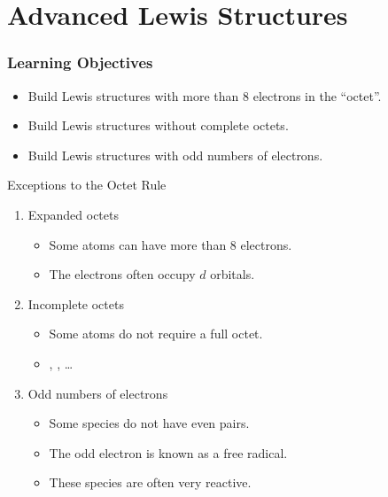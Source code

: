 \documentclass[notes=hide]{beamer}
\begin{document}

\section{Advanced Lewis Structures}
\begin{frame}
	\frametitle{Learning Objectives}
	\begin{itemize}
	\item Build Lewis structures with more than 8 electrons in the
		``octet''.
	\item Build Lewis structures without complete octets.
	\item Build Lewis structures with odd numbers of electrons.
	\end{itemize}
\end{frame}

\begin{frame}{Exceptions to the Octet Rule}
	\begin{enumerate}[<+(1)->]
		\item Expanded octets
			\begin{itemize}[<1->]
				\item Some atoms can have more than 8 electrons.
				\item The electrons often occupy $d$ orbitals.
			\end{itemize}
		\item Incomplete octets
			\begin{itemize}[<1->]
				\item Some atoms do not require a full octet.
				\item {}, , \ldots
			\end{itemize}
		\item Odd numbers of electrons
			\begin{itemize}[<1->]
				\item Some species do not have even
					\alert{pairs}.
				\item The odd electron is known as a \alert{free
					radical}.
				\item These species are often very reactive.
			\end{itemize}
	\end{enumerate}
\end{frame}
\end{document}
